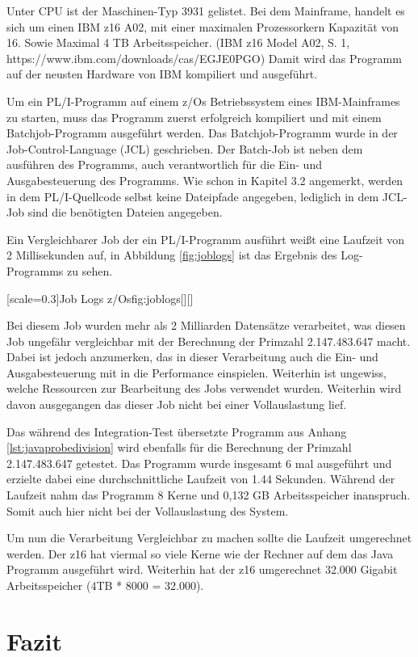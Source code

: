 Unter CPU ist der Maschinen-Typ 3931 gelistet. Bei dem Mainframe, handelt es sich um einen IBM z16 A02, mit
einer maximalen Prozessorkern Kapazität von 16. Sowie Maximal 4 TB Arbeitsspeicher. 
(IBM z16 Model A02, S. 1, https://www.ibm.com/downloads/cas/EGJE0PGO)
Damit wird das Programm auf der neusten Hardware von IBM kompiliert und ausgeführt.

Um ein PL/I-Programm auf einem z/Os Betriebssystem eines IBM-Mainframes zu starten, muss das Programm zuerst erfolgreich kompiliert und mit einem Batchjob-Programm
ausgeführt werden. Das Batchjob-Programm wurde in der Job-Control-Language (JCL) geschrieben.
Der Batch-Job ist neben dem ausführen des Programms, auch verantwortlich für die Ein- und Ausgabesteuerung des Programms.
Wie schon in Kapitel 3.2 angemerkt, werden in dem PL/I-Quellcode selbst keine Dateipfade angegeben, lediglich in dem JCL-Job sind die benötigten Dateien angegeben.

Ein Vergleichbarer Job der ein PL/I-Programm ausführt weißt eine Laufzeit von 2 Millisekunden auf, in Abbildung \ref{fig:joblogs}
ist das Ergebnis des Log-Programms zu sehen.

[scale=0.3]{Job Logs z/Os}{fig:joblogs}[][]

Bei diesem Job wurden mehr als 2 Milliarden Datensätze verarbeitet, was diesen Job ungefähr vergleichbar
mit der Berechnung der Primzahl 2.147.483.647 macht. Dabei ist jedoch anzumerken, das in dieser Verarbeitung
auch die Ein- und Ausgabesteuerung mit in die Performance einspielen. Weiterhin ist ungewiss, welche Ressourcen 
zur Bearbeitung des Jobs verwendet wurden. Weiterhin wird davon ausgegangen das dieser Job nicht bei einer Vollauslastung lief.

Das während des Integration-Test übersetzte Programm aus Anhang \ref{lst:javaprobedivision} wird ebenfalls für die Berechnung der Primzahl
2.147.483.647 getestet.
Das Programm wurde insgesamt 6 mal ausgeführt und erzielte dabei eine durchschnittliche Laufzeit von 1.44 Sekunden.
Während der Laufzeit nahm das Programm 8 Kerne und 0,132 GB Arbeitsspeicher inanspruch.
Somit auch hier nicht bei der Vollauslastung des System.

Um nun die Verarbeitung Vergleichbar zu machen sollte die Laufzeit umgerechnet werden.
Der z16 hat viermal so viele Kerne wie der Rechner auf dem das Java Programm ausgeführt wird.
Weiterhin hat der z16 umgerechnet 32.000 Gigabit Arbeitsspeicher (4TB * 8000 = 32.000).


\section{Fazit}
